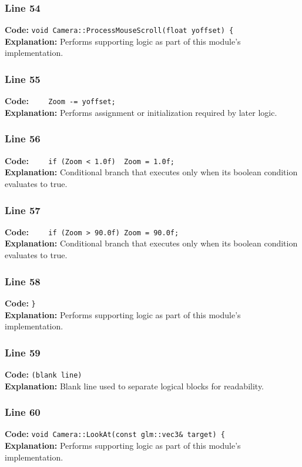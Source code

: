 \documentclass[11pt,a4paper]{article}
\begin{document}
\subsubsection*{Line 54}
\textbf{Code:} \verb|void Camera::ProcessMouseScroll(float yoffset) {|\\
\textbf{Explanation:} Performs supporting logic as part of this module's implementation.

\subsubsection*{Line 55}
\textbf{Code:} \verb|    Zoom -= yoffset;|\\
\textbf{Explanation:} Performs assignment or initialization required by later logic.

\subsubsection*{Line 56}
\textbf{Code:} \verb|    if (Zoom < 1.0f)  Zoom = 1.0f;|\\
\textbf{Explanation:} Conditional branch that executes only when its boolean condition evaluates to true.

\subsubsection*{Line 57}
\textbf{Code:} \verb|    if (Zoom > 90.0f) Zoom = 90.0f;|\\
\textbf{Explanation:} Conditional branch that executes only when its boolean condition evaluates to true.

\subsubsection*{Line 58}
\textbf{Code:} \verb|}|\\
\textbf{Explanation:} Performs supporting logic as part of this module's implementation.

\subsubsection*{Line 59}
\textbf{Code:} \texttt{(blank line)}\\
\textbf{Explanation:} Blank line used to separate logical blocks for readability.

\subsubsection*{Line 60}
\textbf{Code:} \verb|void Camera::LookAt(const glm::vec3& target) {|\\
\textbf{Explanation:} Performs supporting logic as part of this module's implementation.
\end{document}
